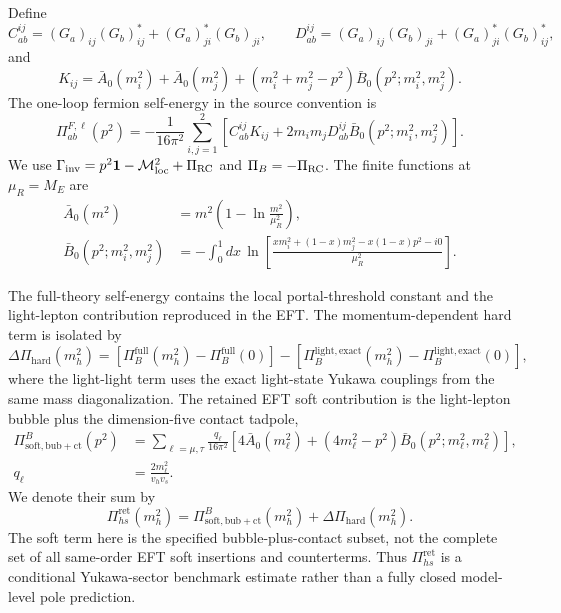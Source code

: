 \documentclass[12pt,a4paper]{article}
\begin{document}
Define
\[
C_{ab}^{ij}=(G_a)_{ij}(G_b)_{ij}^{*}
 +(G_a)_{ji}^{*}(G_b)_{ji},
\qquad
D_{ab}^{ij}=(G_a)_{ij}(G_b)_{ji}
 +(G_a)_{ji}^{*}(G_b)_{ij}^{*},
\]
and
\[
K_{ij}=\bar A_0(m_i^2)+\bar A_0(m_j^2)
 +(m_i^2+m_j^2-p^2)\bar B_0(p^2;m_i^2,m_j^2).
\]
The one-loop fermion self-energy in the source convention is
\[
\Pi_{ab}^{F,\ell}(p^2)
=-\frac{1}{16\pi^2}\sum_{i,j=1}^{2}
\left[C_{ab}^{ij}K_{ij}
+2m_im_jD_{ab}^{ij}\bar B_0(p^2;m_i^2,m_j^2)\right].
\]
We use \(\Gamma_{\rm inv}=p^2\mathbf1-\mathcal M_{\rm loc}^2+\Pi_{\rm RC}\) and \(\Pi_B=-\Pi_{\rm RC}\). The finite functions at \(\mu_R=M_E\) are
\[
\begin{aligned}
\bar A_0(m^2)&=m^2\left(1-\ln\frac{m^2}{\mu_R^2}\right),\\
\bar B_0(p^2;m_i^2,m_j^2)
&=-\int_0^1dx\,
\ln\!\left[
\frac{xm_i^2+(1-x)m_j^2-x(1-x)p^2-i0}{\mu_R^2}
\right].
\end{aligned}
\]

The full-theory self-energy contains the local portal-threshold constant and the light-lepton contribution reproduced in the EFT. The momentum-dependent hard term is isolated by
\[
\Delta\Pi_{\mathrm{hard}}(m_h^2)=
[\Pi_B^{\mathrm{full}}(m_h^2)-\Pi_B^{\mathrm{full}}(0)]
-[\Pi_B^{\mathrm{light,exact}}(m_h^2)-\Pi_B^{\mathrm{light,exact}}(0)],
\]
where the light-light term uses the exact light-state Yukawa couplings from the same mass diagonalization. The retained EFT soft contribution is the light-lepton bubble plus the dimension-five contact tadpole,
\[
\begin{aligned}
\Pi_{\mathrm{soft,bub+ct}}^B(p^2)
&=\sum_{\ell=\mu,\tau}\frac{q_\ell}{16\pi^2}
\left[4\bar A_0(m_\ell^2)
+(4m_\ell^2-p^2)\bar B_0(p^2;m_\ell^2,m_\ell^2)\right],\\
q_\ell&=\frac{2m_\ell^2}{v_hv_s}.
\end{aligned}
\]
We denote their sum by
\[
\Pi_{hs}^{\mathrm{ret}}(m_h^2)
=\Pi_{\mathrm{soft,bub+ct}}^B(m_h^2)
+\Delta\Pi_{\mathrm{hard}}(m_h^2).
\]
The soft term here is the specified bubble-plus-contact subset, not the complete set of all same-order EFT soft insertions and counterterms. Thus \(\Pi_{hs}^{\mathrm{ret}}\) is a conditional Yukawa-sector benchmark estimate rather than a fully closed model-level pole prediction.
\end{document}
